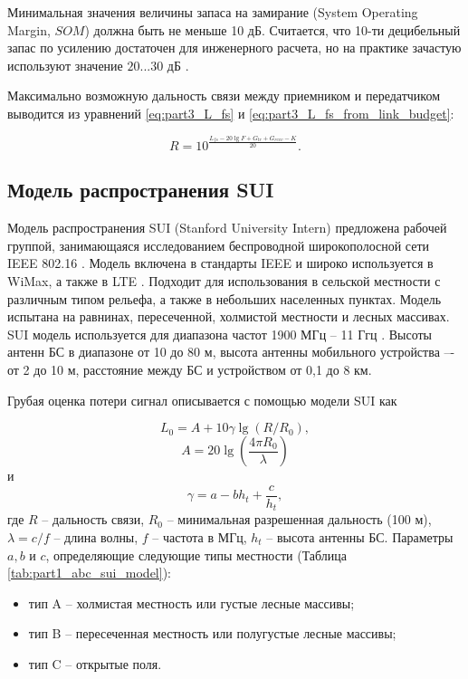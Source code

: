 Минимальная значения величины запаса на замирание  (System Operating Margin, $SOM$) должна быть не меньше  10 дБ. Считается, что 10-ти децибельный запас по усилению достаточен для инженерного расчета, но на практике зачастую используют значение $20 ... 30$ дБ \cite{Proletarsky}.







Максимально возможную дальность связи между приемником и передатчиком выводится из уравнений \cref{eq:part3_L_fs} и \cref{eq:part3_L_fs_from_link_budget}:

\begin{equation}
  \label{eq:part1_fspl_model_r}
  R = 10^\frac{L_{fs} - 20\lg{F} + G_{tr} + G_{recv} - K}{20}.
\end{equation}





\subsection{Модель распространения SUI}

Модель распространения SUI (Stanford University Intern) предложена рабочей группой, занимающаяся исследованием беспроводной широкополосной сети IEEE 802.16 \cite{Mollel2014}. Модель включена в стандарты IEEE и широко используется в WiMax, а также в LTE \cite{Zreikat2017}. Подходит для использования в сельской местности с различным типом рельефа, а также в небольших населенных пунктах. Модель испытана на равнинах, пересеченной, холмистой местности и лесных массивах. SUI модель используется для диапазона частот 1900 МГц -- 11 Ггц \cite{Cabuk2020}. Высоты антенн БС в диапазоне от 10 до 80 м, высота антенны мобильного устройства –- от 2 до 10 м, расстояние между БС и устройством от 0,1 до 8 км.

Грубая оценка потери сигнал описывается с помощью модели SUI как

\begin{equation}
  \label{eq:part1_sui_l0}
  L_0 = A + 10\gamma\lg{(R/R_0)},
\end{equation}
$$
A = 20\lg{(\frac{4\pi R_0 }{\lambda})}
$$
и
$$
\gamma = a - b h_t + \frac{c}{h_t}, 
$$
где $R$ -- дальность связи, $R_0$ -- минимальная разрешенная дальность (100 м), $\lambda = c / f$ -- длина волны, $f$ -- частота в МГц, $h_t$ -- высота антенны БС. Параметры $a, b$ и $c$, определяющие следующие типы местности (Таблица \cref{tab:part1_abc_sui_model}):
\begin{itemize}
  \item тип A -- холмистая местность или густые лесные массивы;
  \item тип B -- пересеченная местность или полугустые лесные массивы;
  \item тип C -- открытые поля.
\end{itemize}


